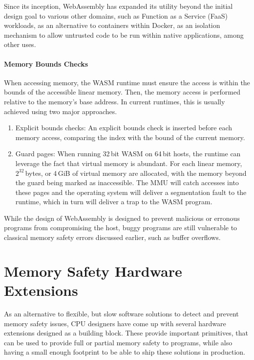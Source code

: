 Since its inception, WebAssembly has expanded its utility beyond the initial design goal to various other domains, such as Function as a Service (FaaS) workloads, as an alternative to containers within Docker, as an isolation mechanism to allow untrusted code to be run within native applications, among other uses.

\paragraph{Memory Bounds Checks}
When accessing memory, the \ac{WASM} runtime must ensure the access is within the bounds of the accessible linear memory.
Then, the memory access is performed relative to the memory's base address.
In current runtimes, this is usually achieved using two major approaches.
\begin{enumerate}
    \item Explicit bounds checks: An explicit bounds check is inserted before each memory access, comparing the index with the bound of the current memory.
    \item Guard pages: When running 32\,bit \ac{WASM} on 64\,bit hosts, the runtime can leverage the fact that virtual memory is abundant.
    For each linear memory, $2^{32}$\,bytes, or 4\,GiB of virtual memory are allocated, with the memory beyond the guard being marked as inaccessible.
    The MMU will catch accesses into these pages and the operating system will deliver a segmentation fault to the runtime, which in turn will deliver a trap to the \ac{WASM} program.
\end{enumerate}


While the design of WebAssembly is designed to prevent malicious or erronous programs from compromising the host, buggy programs are still vulnerable to classical memory safety errors discussed earlier, such as buffer overflows.

\section{Memory Safety Hardware Extensions}
\label{sec:memory-safety-hardware-extensions}

As an alternative to flexible, but slow software solutions to detect and prevent memory safety issues, CPU designers have come up with several hardware extensions designed as a building block.
These provide important primitives, that can be used to provide full or partial memory safety to programs, while also having a small enough footprint to be able to ship these solutions in production.

